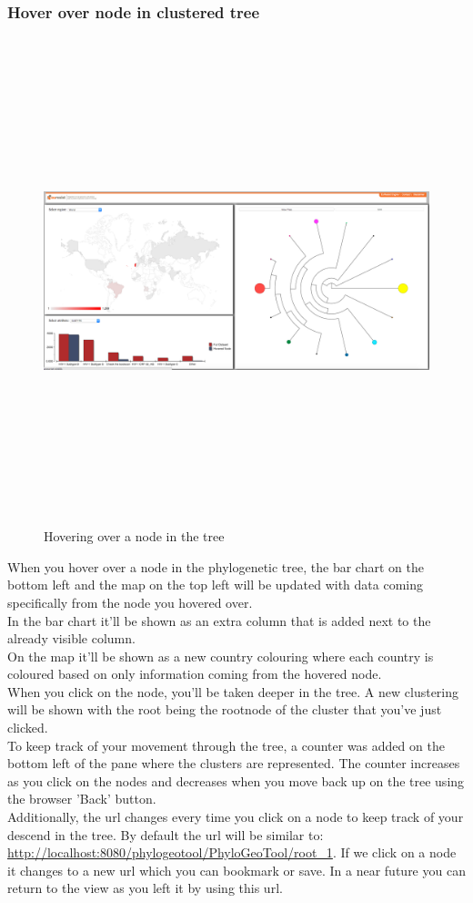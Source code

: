 \documentclass[a4paper, 11pt]{article} %
\begin{document}
\subsubsection{Hover over node in clustered tree}
\begin{figure}[H]
\centering
\includegraphics[width=400pt, height=400pt, keepaspectratio=true]{images/hover_node.PNG}
\caption{Hovering over a node in the tree}
\label{fig:hover_node}
\end{figure}

When you hover over a node in the phylogenetic tree, the bar chart on the bottom left and the map on the top left will be updated with data coming specifically from the node you hovered over.
\\
In the bar chart it'll be shown as an extra column that is added next to the already visible column.
\\
On the map it'll be shown as a new country colouring where each country is coloured based on only information coming from the hovered node.
\\
When you click on the node, you'll be taken deeper in the tree. A new clustering will be shown with the root being the rootnode of the cluster that you've just clicked.
\\
To keep track of your movement through the tree, a counter was added on the bottom left of the pane where the clusters are represented. The counter increases as you click on the nodes and decreases when you move back up on the tree using the browser 'Back' button.
\\
Additionally, the url changes every time you click on a node to keep track of your descend in the tree. By default the url will be similar to: \url{http://localhost:8080/phylogeotool/PhyloGeoTool/root_1}. If we click on a node it changes to a new url which you can bookmark or save. In a near future you can return to the view as you left it by using this url.
\end{document}
